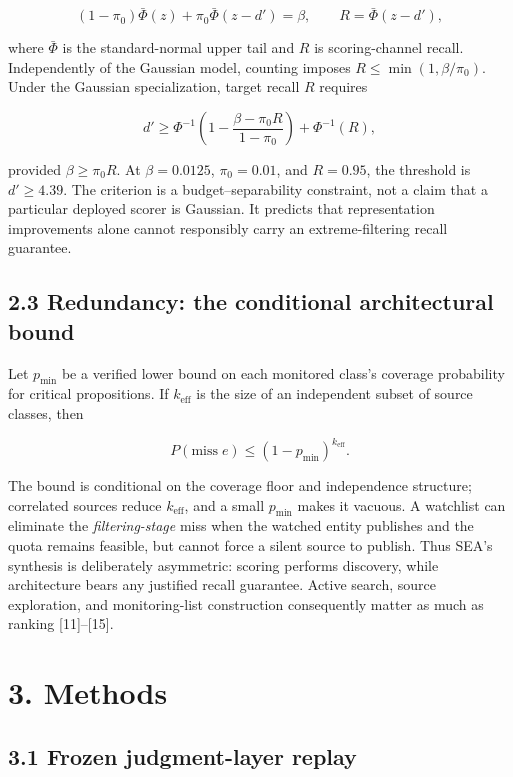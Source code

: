 \documentclass[
  conference,10pt]{IEEEtran}
\begin{document}
\[
(1-\pi_0)\bar\Phi(z)+\pi_0\bar\Phi(z-d')=\beta,
\qquad R=\bar\Phi(z-d'),
\]

where \(\bar\Phi\) is the standard-normal upper tail and \(R\) is scoring-channel recall. Independently of the Gaussian model, counting imposes \(R\le\min(1,\beta/\pi_0)\). Under the Gaussian specialization, target recall \(R\) requires

\[
d'\ge \Phi^{-1}\!\left(1-\frac{\beta-\pi_0R}{1-\pi_0}\right)+\Phi^{-1}(R),
\]

provided \(\beta\ge\pi_0R\). At \(\beta=0.0125\), \(\pi_0=0.01\), and \(R=0.95\), the threshold is \(d'\ge4.39\). The criterion is a budget--separability constraint, not a claim that a particular deployed scorer is Gaussian. It predicts that representation improvements alone cannot responsibly carry an extreme-filtering recall guarantee.

\subsection{2.3 Redundancy: the conditional architectural bound}\label{redundancy-the-conditional-architectural-bound}

Let \(p_{\min}\) be a verified lower bound on each monitored class's coverage probability for critical propositions. If \(k_{\mathrm{eff}}\) is the size of an independent subset of source classes, then

\[
P(\mathrm{miss}\;e)\le(1-p_{\min})^{k_{\mathrm{eff}}}.
\]

The bound is conditional on the coverage floor and independence structure; correlated sources reduce \(k_{\mathrm{eff}}\), and a small \(p_{\min}\) makes it vacuous. A watchlist can eliminate the \emph{filtering-stage} miss when the watched entity publishes and the quota remains feasible, but cannot force a silent source to publish. Thus SEA's synthesis is deliberately asymmetric: scoring performs discovery, while architecture bears any justified recall guarantee. Active search, source exploration, and monitoring-list construction consequently matter as much as ranking {[}11{]}--{[}15{]}.

\section{3. Methods}\label{methods}

\subsection{3.1 Frozen judgment-layer replay}\label{frozen-judgment-layer-replay}
\end{document}
